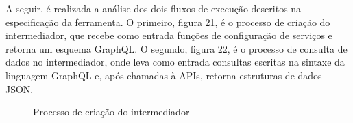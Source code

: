 A seguir, é realizada a análise dos dois fluxos de execução descritos na especificação da ferramenta. O primeiro, figura 21, é o processo de criação do intermediador, que recebe como entrada funções de configuração de serviços e retorna um esquema GraphQL. O segundo, figura 22, é o processo de consulta de dados no intermediador, onde leva como entrada consultas escritas na sintaxe da linguagem GraphQL e, após chamadas à APIs, retorna estruturas de dados JSON.

\begin{figure}[H]
  \centering
  
  \caption{Processo de criação do intermediador}
\end{figure}

